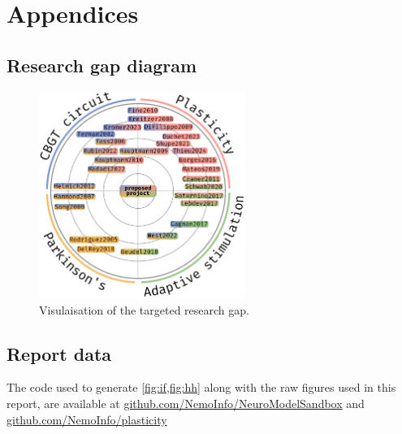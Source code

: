 \appendix
\section*{Appendices}
\renewcommand{\thesubsection}{\Alph{subsection}}
\subsection{Research gap diagram}
\begin{figure}[ht]
	\centering
	\includegraphics[width=0.6\textwidth]{figs/lit_diagram.pdf}
	\caption{Visulaisation of the targeted research gap.}
	\label{fig:gap}
\end{figure}

\subsection{Report data}
The code used to generate \cref{fig:if,fig:hh} along with the raw figures used in this report, are available at
\url{github.com/NemoInfo/NeuroModelSandbox} and \url{github.com/NemoInfo/plasticity}



